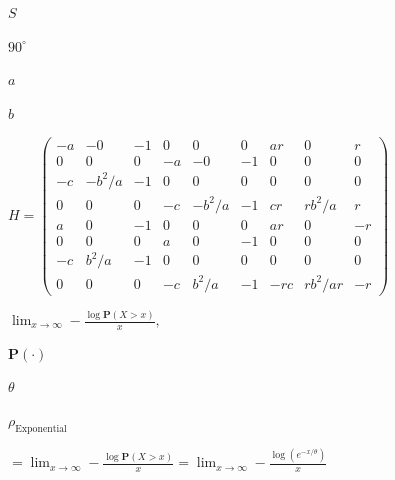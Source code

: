 \documentclass{article}
\def\lthtmlcheckvsize{\ifdim\ht\sizebox<\vsize 
  \ifdim\wd\sizebox<\hsize\expandafter\hfill\fi \expandafter\vfill
  \else\expandafter\vss\fi}%
\begin{document}
{\newpage\clearpage
{}%
$ S$%
\lthtmlindisplaymathZ
\lthtmlcheckvsize\clearpage}

{\newpage\clearpage
{}%
$ 90^{\circ}$%
\lthtmlindisplaymathZ
\lthtmlcheckvsize\clearpage}

{\newpage\clearpage
{}%
$ a$%
\lthtmlindisplaymathZ
\lthtmlcheckvsize\clearpage}

{\newpage\clearpage
{}%
$ b$%
\lthtmlindisplaymathZ
\lthtmlcheckvsize\clearpage}

{\newpage\clearpage
{}%
$\displaystyle H=
\begin{pmatrix}
  -a &-0 &-1 &0 &0 &0 &ar &0 &r \\
  0 &0 &0 &-a &-0 &-1 & 0& 0 &0 \\
  -c &-b^2/a& -1& 0& 0& 0 &0& 0& 0 \\
  0 &0 &0 &-c &-b^2/a &-1 &cr &rb^2/a& r\\
  a &0 &-1& 0& 0 &0 & ar &0 &-r \\
  0 &0 &0 &a &0 &-1 &0 &0 &0\\
  -c &b^2/a& -1& 0& 0& 0& 0& 0& 0 \\
  0 &0 &0 &-c &b^2/a &-1 &-rc &rb^2/ar &-r 
\end{pmatrix}
$%
\lthtmlindisplaymathZ
\lthtmlcheckvsize\clearpage}

{\newpage\clearpage
{}%
$\displaystyle \lim_{x \rightarrow \infty} -\frac{\log\textbf{P}(X > x)}{x},$%
\lthtmlindisplaymathZ
\lthtmlcheckvsize\clearpage}

{\newpage\clearpage
{}%
$ \textbf{P}(\cdot)$%
\lthtmlindisplaymathZ
\lthtmlcheckvsize\clearpage}

{\newpage\clearpage
{}%
$ \theta$%
\lthtmlindisplaymathZ
\lthtmlcheckvsize\clearpage}

{\newpage\clearpage
{}%
$\displaystyle \rho_{\text{Exponential}}$%
\lthtmlindisplaymathZ
\lthtmlcheckvsize\clearpage}

{\newpage\clearpage
{}%
$\displaystyle =\lim_{x \rightarrow \infty} -\frac{\log\textbf{P}(X > x)}{x}  = \lim_{x \rightarrow \infty} -\frac{\log(e^{- x/\theta})}{x}$%
\lthtmlindisplaymathZ
\lthtmlcheckvsize\clearpage}
\end{document}
